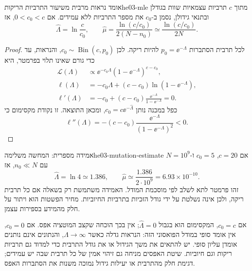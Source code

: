 \begin{proposition}{אומד נראות מרבית משיעור התרביות הריקות}{he03-mle}
מתוך $c$ תרביות עצמאיות שוות בגודלן ובתנאי גידולן, נסמן ב-$c_0$ את מספר התרביות ללא עמידים. אם $0<c_0<c$, אז
\begin{equation}\label{eq:he03-mle}
\widehat\Lambda=\ln\frac c{c_0},\qquad
\widehat\mu=\frac{\ln(c/c_0)}{2(N-n_0)}\simeq\frac{\ln(c/c_0)}{2N}.
\end{equation}
\end{proposition}
\begin{proof}
לכל תרבית הסתברות $p_0=\ee^{-\Lambda}$ להיות ריקה. לכן $c_0\sim\operatorname{Bin}(c,p_0)$, והנראות, עד כדי גורם שאינו תלוי בפרמטר, היא
\begin{align}
\mathcal L(\Lambda)&\propto\ee^{-c_0\Lambda}(1-\ee^{-\Lambda})^{c-c_0},\label{eq:he03-likelihood}\\
\ell(\Lambda)&=-c_0\Lambda+(c-c_0)\ln(1-\ee^{-\Lambda}),\label{eq:he03-log-likelihood}\\
\ell'(\Lambda)&=-c_0+(c-c_0)\frac{\ee^{-\Lambda}}{1-\ee^{-\Lambda}}=0.\label{eq:he03-score}
\end{align}
כפל במכנה נותן $c_0=c\ee^{-\widehat\Lambda}$, ומכאן התוצאה. זו נקודת מקסימום כי
\begin{equation}\label{eq:he03-concavity}
\ell''(\Lambda)=-(c-c_0)\frac{\ee^{-\Lambda}}{(1-\ee^{-\Lambda})^2}<0.
\end{equation}
\end{proof}

\begin{example}{אמידה מספרית: המחשה משלימה}{he03-mutation-estimate}
אם $c=20$, $c_0=5$ ו-$N=10^9$ עם $n_0\ll N$, אז
\begin{equation}\label{eq:he03-mutation-numeric}
\widehat\Lambda=\ln4\simeq1.386,\qquad
\widehat\mu\simeq\frac{1.386}{2\cdot10^9}=6.93\times10^{-10}.
\end{equation}
זהו פרמטר לתא לשלב לפי מוסכמת המודל. האמידה משתמשת רק בשאלה אם כל תרבית ריקה, ולכן אינה נשלטת על ידי גודל הזכיות בתרביות החיוביות. מחיר הפשטות הוא ויתור על חלק מהמידע בספירות עצמן.
\end{example}

\begin{remark}
אם $c_0=c$, המקסימום הוא בגבול $\widehat\Lambda=0$; אין בכך הוכחה שקצב המוטציה אפס. אם $c_0=0$, אין אומד סופי במודל הפואסוני הזה: הנראות גדלה כאשר $\Lambda\to\infty$, והנתונים אינם נותנים אומדן עליון סופי. יש להתאים את משך הגידול או את גודל התרבית כדי למדוד גם תרביות ריקות וגם חיוביות. שיטת האפסים מניחה גם זיהוי אמין של כל תרבית שבה יש עמידים; דגימת חלק מהתרבית או יעילות גידול נמוכה משנות את הסתברות האפס.
\end{remark}

